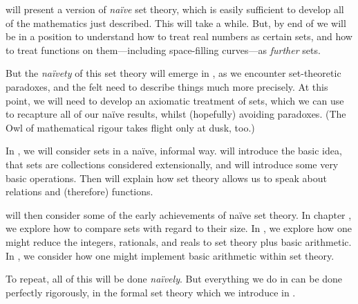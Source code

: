  will present a version of \emph{na\"ive} set
theory, which is easily sufficient to develop all of the mathematics
just described. This will take a while. But, by end of
 we will be in a position to understand how to
treat real numbers as certain sets, and how to treat functions on
them---including space-filling curves---as \emph{further} sets. 

But the \emph{na\"ivety} of this set theory will emerge in
, as we encounter set-theoretic paradoxes, and
the felt need to describe things much more precisely. At this point,
we will need to develop an axiomatic treatment of sets, which we can
use to recapture all of our na\"ive results, whilst (hopefully)
avoiding paradoxes. (The Owl of mathematical rigour takes flight only
at dusk, too.)

\OLEndChapterHook


In , we will consider sets in a na\"ive, informal
way.  will introduce the basic idea, that sets
are collections considered extensionally, and will introduce some very
basic operations. Then  will
explain how set theory allows us to speak about relations and
(therefore) functions. 

 will then consider some of the
early achievements of na\"ive set theory. In chapter
, we explore how to compare sets with regard
to their size. In , we explore how one
might reduce the integers, rationals, and reals to set theory plus
basic arithmetic. In , we consider how one
might implement basic arithmetic within set theory. 

To repeat, all of this will be done \emph{na\"ively}. But everything
we do in  can be done perfectly rigorously, in
the formal set theory which we introduce in .



